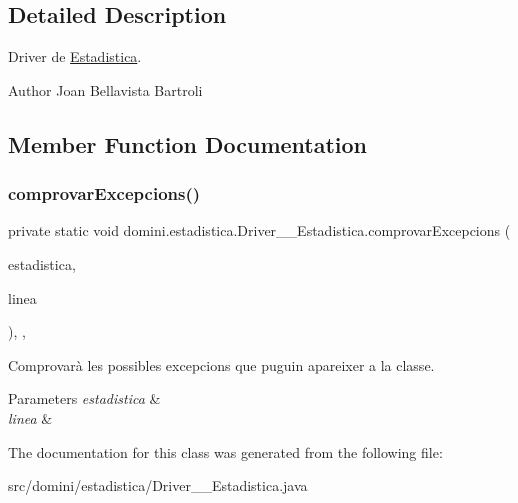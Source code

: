 \subsection{Detailed Description}
Driver de \hyperlink{classdomini_1_1estadistica_1_1Estadistica}{Estadistica}. 

\begin{DoxyAuthor}{Author}
Joan Bellavista Bartroli 
\end{DoxyAuthor}


\subsection{Member Function Documentation}
\mbox{\label{classdomini_1_1estadistica_1_1Driver____Estadistica_a3459f11af9841b23ac81a409a3e84e22}} 
\subsubsection{\texorpdfstring{comprovar\+Excepcions()}{comprovarExcepcions()}}
{\footnotesize\ttfamily private static void domini.\+estadistica.\+Driver\+\_\+\+\_\+\+Estadistica.\+comprovar\+Excepcions (\begin{DoxyParamCaption}\item[{\hyperlink{classdomini_1_1estadistica_1_1Estadistica}{Estadistica}}]{estadistica,  }\item[{String}]{linea }\end{DoxyParamCaption})\hspace{0.3cm}{\ttfamily [inline]}, {\ttfamily [static]}, {\ttfamily [private]}}



Comprovarà les possibles excepcions que puguin apareixer a la classe. 


\begin{DoxyParams}{Parameters}
{\em estadistica} & \\
\hline
{\em linea} & \\
\hline
\end{DoxyParams}


The documentation for this class was generated from the following file\+:\begin{DoxyCompactItemize}
\item 
src/domini/estadistica/Driver\+\_\+\+\_\+\+Estadistica.\+java\end{DoxyCompactItemize}
